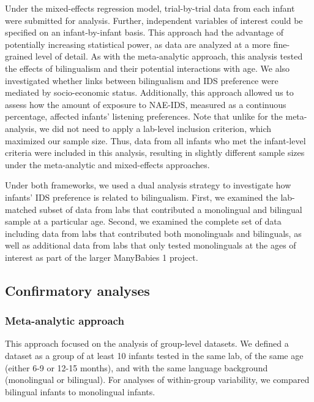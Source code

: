 \documentclass[
  english,
  ,man,floatsintext]{apa6}
\begin{document}
Under the mixed-effects regression model, trial-by-trial data from each infant were submitted for analysis. Further, independent variables of interest could be specified on an infant-by-infant basis. This approach had the advantage of potentially increasing statistical power, as data are analyzed at a more fine-grained level of detail. As with the meta-analytic approach, this analysis tested the effects of bilingualism and their potential interactions with age. We also investigated whether links between bilingualism and IDS preference were mediated by socio-economic status. Additionally, this approach allowed us to assess how the amount of exposure to NAE-IDS, measured as a continuous percentage, affected infants' listening preferences. Note that unlike for the meta-analysis, we did not need to apply a lab-level inclusion criterion, which maximized our sample size. Thus, data from all infants who met the infant-level criteria were included in this analysis, resulting in slightly different sample sizes under the meta-analytic and mixed-effects approaches.

Under both frameworks, we used a dual analysis strategy to investigate how infants' IDS preference is related to bilingualism. First, we examined the lab-matched subset of data from labs that contributed a monolingual and bilingual sample at a particular age. Second, we examined the complete set of data including data from labs that contributed both monolinguals and bilinguals, as well as additional data from labs that only tested monolinguals at the ages of interest as part of the larger ManyBabies 1 project.

\hypertarget{confirmatory-analyses}{%
\subsection{Confirmatory analyses}\label{confirmatory-analyses}}

\hypertarget{meta-analytic-approach}{%
\subsubsection{Meta-analytic approach}\label{meta-analytic-approach}}

This approach focused on the analysis of group-level datasets. We defined a dataset as a group of at least 10 infants tested in the same lab, of the same age (either 6-9 or 12-15 months), and with the same language background (monolingual or bilingual). For analyses of within-group variability, we compared bilingual infants to monolingual infants.
\end{document}
